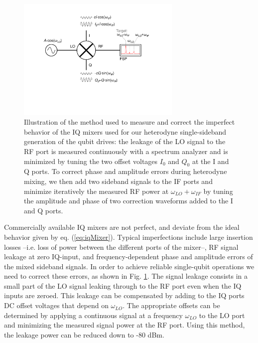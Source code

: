 \begin{figure}[ht!]
	\centering
		\includegraphics[width=0.7\textwidth]{"./material/figures/measurement/mixer_imperfections"}
	\caption[...]{Illustration of the method used to measure and correct the imperfect behavior of the IQ mixers used for  our heterodyne single-sideband generation of the qubit drives: the leakage of the LO signal to the RF port is measured continuously with a spectrum analyzer and is minimized by tuning the two offset voltages $I_0$ and $Q_0$ at the I and Q ports. To correct phase and amplitude errors during heterodyne mixing, we then add two sideband signals to the IF ports and minimize iteratively the measured RF power at $\omega_{LO}+\omega_{IF}$ by tuning the amplitude and phase of two correction waveforms added to the I and Q ports.}
	\label{fig:iq_mixer_correction}
\end{figure}

Commercially available IQ mixers are not perfect, and deviate from the ideal behavior given by eq. (\ref{eq:iqMixer}). Typical imperfections include large insertion losses --i.e. loss of  power between the different ports of the mixer--, RF signal leakage at zero IQ-input, and frequency-dependent phase and amplitude errors of the mixed sideband signals. In order to achieve reliable single-qubit operations we need to correct these errors, as shown in Fig. \ref{fig:iq_mixer_correction}. The signal leakage consists in a small part of the LO signal leaking through to the RF port even when the IQ inputs are zeroed. This leakage can be compensated by adding to the IQ ports DC offset voltages that depend on $\omega_{LO}$. The appropriate offsets can be determined by applying a continuous signal at a frequency $\omega_{LO}$ to the LO port and minimizing the measured signal power at the RF port. Using this method, the leakage power can be reduced down to -80 dBm.

